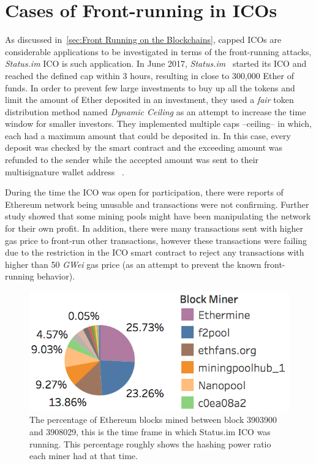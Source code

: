 \section{Cases of Front-running in ICOs} 

As discussed in~\ref{sec:Front Running on the Blockchains}, capped ICOs are considerable applications to be investigated in terms of the front-running attacks, \textit{Status.im} ICO is such application. In June 2017, \textit{Status.im}~\cite{statuswhitepaper} started its ICO and reached the defined cap within 3 hours, resulting in close to 300,000 Ether of funds. In order to prevent few large investments to buy up all the tokens and limit the amount of Ether deposited in an investment, they used a \textit{fair} token distribution method named \textit{Dynamic Ceiling} as an attempt to increase the time window for smaller investors. They implemented multiple caps --ceiling-- in which, each had a maximum amount that could be deposited in. In this case, every deposit was checked by the smart contract and the exceeding amount was refunded to the sender while the accepted amount was sent to their multisignature wallet address ~\cite{statusicoanalysis}. 

During the time the ICO was open for participation, there were reports of Ethereum network being unusable and transactions were not confirming. Further study showed that some mining pools might have been manipulating the network for their own profit. In addition, there were many transactions sent with higher gas price to front-run other transactions, however these transactions were failing due to the restriction in the ICO smart contract to reject any transactions with higher than 50 \textit{GWei} gas price (as an attempt to prevent the known front-running behavior).

\begin{figure}[h]
\centering
\includegraphics[width=0.5\linewidth]{figures/Mining_pool_ratio.png}
\caption{The percentage of Ethereum blocks mined between block 3903900 and 3908029, this is the time frame in which Status.im ICO was running. This percentage roughly shows the hashing power ratio each miner had at that time. \label{fig:mining_pool_ratio}} %
\end{figure}

